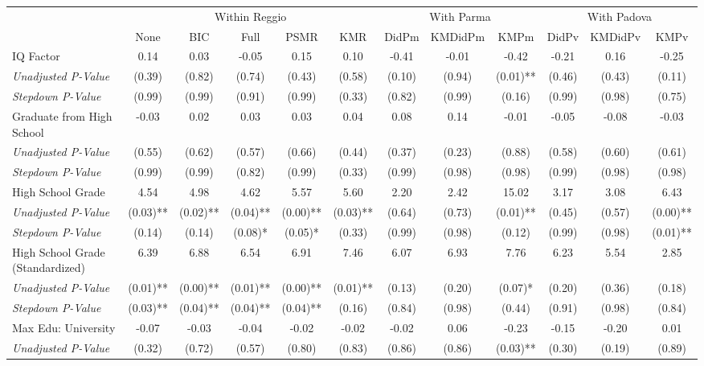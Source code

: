 \begin{tabular}{l c c c c c c c c c c c}
\toprule
& \multicolumn{5}{c}{Within Reggio} & \multicolumn{3}{c}{With Parma} & \multicolumn{3}{c}{With Padova} \\\cmidrule(lr){2-6} \cmidrule(lr){7-9} \cmidrule(lr){10-12}
 & None & BIC & Full & PSMR & KMR & DidPm & KMDidPm & KMPm & DidPv & KMDidPv & KMPv \\
\midrule
IQ Factor & 0.14 & 0.03 & -0.05 & 0.15 & 0.10 & -0.41 & -0.01 & -0.42 & -0.21 & 0.16 & -0.25 \\
\quad \textit{Unadjusted P-Value} & (0.39) & (0.82) & (0.74) & (0.43) & (0.58) & (0.10) & (0.94) & (0.01)** & (0.46) & (0.43) & (0.11) \\
\quad \textit{Stepdown P-Value} & (0.99) & (0.99) & (0.91) & (0.99) & (0.33) & (0.82) & (0.99) & (0.16) & (0.99) & (0.98) & (0.75) \\
Graduate from High School & -0.03 & 0.02 & 0.03 & 0.03 & 0.04 & 0.08 & 0.14 & -0.01 & -0.05 & -0.08 & -0.03 \\
\quad \textit{Unadjusted P-Value} & (0.55) & (0.62) & (0.57) & (0.66) & (0.44) & (0.37) & (0.23) & (0.88) & (0.58) & (0.60) & (0.61) \\
\quad \textit{Stepdown P-Value} & (0.99) & (0.99) & (0.82) & (0.99) & (0.33) & (0.99) & (0.98) & (0.98) & (0.99) & (0.98) & (0.98) \\
High School Grade & 4.54 & 4.98 & 4.62 & 5.57 & 5.60 & 2.20 & 2.42 & 15.02 & 3.17 & 3.08 & 6.43 \\
\quad \textit{Unadjusted P-Value} & (0.03)** & (0.02)** & (0.04)** & (0.00)** & (0.03)** & (0.64) & (0.73) & (0.01)** & (0.45) & (0.57) & (0.00)** \\
\quad \textit{Stepdown P-Value} & (0.14) & (0.14) & (0.08)* & (0.05)* & (0.33) & (0.99) & (0.98) & (0.12) & (0.99) & (0.98) & (0.01)** \\
High School Grade (Standardized) & 6.39 & 6.88 & 6.54 & 6.91 & 7.46 & 6.07 & 6.93 & 7.76 & 6.23 & 5.54 & 2.85 \\
\quad \textit{Unadjusted P-Value} & (0.01)** & (0.00)** & (0.01)** & (0.00)** & (0.01)** & (0.13) & (0.20) & (0.07)* & (0.20) & (0.36) & (0.18) \\
\quad \textit{Stepdown P-Value} & (0.03)** & (0.04)** & (0.04)** & (0.04)** & (0.16) & (0.84) & (0.98) & (0.44) & (0.91) & (0.98) & (0.84) \\
Max Edu: University & -0.07 & -0.03 & -0.04 & -0.02 & -0.02 & -0.02 & 0.06 & -0.23 & -0.15 & -0.20 & 0.01 \\
\quad \textit{Unadjusted P-Value} & (0.32) & (0.72) & (0.57) & (0.80) & (0.83) & (0.86) & (0.86) & (0.03)** & (0.30) & (0.19) & (0.89) \\

\end{tabular}
